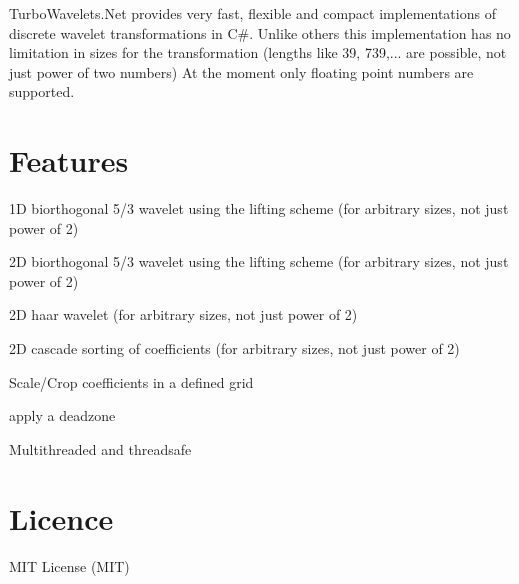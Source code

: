 \-Turbo\-Wavelets.\-Net provides very fast, flexible and compact implementations of discrete wavelet transformations in \-C\#. \-Unlike others this implementation has no limitation in sizes for the transformation (lengths like 39, 739,... are possible, not just power of two numbers) \-At the moment only floating point numbers are supported.\hypertarget{index_Features}{}\section{\-Features}\label{index_Features}

\begin{DoxyItemize}
\item 1\-D biorthogonal 5/3 wavelet using the lifting scheme (for arbitrary sizes, not just power of 2)
\item 2\-D biorthogonal 5/3 wavelet using the lifting scheme (for arbitrary sizes, not just power of 2)
\item 2\-D haar wavelet (for arbitrary sizes, not just power of 2)
\item 2\-D cascade sorting of coefficients (for arbitrary sizes, not just power of 2)
\item \-Scale/\-Crop coefficients in a defined grid
\item apply a deadzone
\item \-Multithreaded and threadsafe
\end{DoxyItemize}\hypertarget{index_Licence}{}\section{\-Licence}\label{index_Licence}
\-M\-I\-T \-License (\-M\-I\-T) 